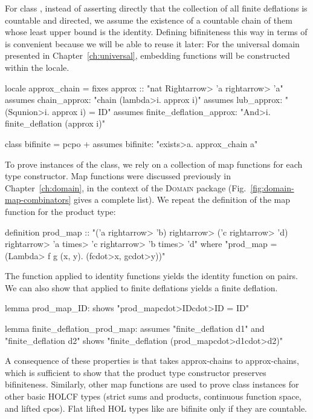 For class , instead of asserting directly that the collection of all finite deflations is countable and directed, we assume the existence of a countable chain of them whose least upper bound is the identity. Defining bifiniteness this way in terms of  is convenient because we will be able to reuse it later: For the universal domain presented in Chapter~\ref{ch:universal}, embedding functions will be constructed within the  locale.
%
\begin{isacode}
locale approx_chain =
  fixes approx :: "nat \<Rightarrow> 'a \<rightarrow> 'a"
  assumes chain_approx: "chain (\<lambda>i. approx i)"
  assumes lub_approx: "(\<Squnion>i. approx i) = ID"
  assumes finite_deflation_approx: "\<And>i. finite_deflation (approx i)"
\end{isacode}
\unmedskip
{}
\begin{isacode}
class bifinite = pcpo +
  assumes bifinite: "\<exists>a. approx_chain a"
\end{isacode}
%
To prove instances of the  class, we rely on a collection of map functions for each type constructor. Map functions were discussed previously in Chapter~\ref{ch:domain}, in the context of the \textsc{Domain} package (Fig.~\ref{fig:domain-map-combinators} gives a complete list). We repeat the definition of the map function for the product type:
%
\begin{isacode}
definition prod_map :: "('a \<rightarrow> 'b) \<rightarrow> ('c \<rightarrow> 'd) \<rightarrow> 'a \<times> 'c \<rightarrow> 'b \<times> 'd"
  where "prod_map = (\<Lambda> f g (x, y). (f\<cdot>x, g\<cdot>y))"
\end{isacode}
%
The  function applied to identity functions yields the identity function on pairs. We can also show that  applied to finite deflations yields a finite deflation.
%
\begin{isacode}
lemma prod_map_ID:
  shows "prod_map\<cdot>ID\<cdot>ID = ID"
\end{isacode}
\unmedskip
{}
\begin{isacode}
lemma finite_deflation_prod_map:
  assumes "finite_deflation d1" and "finite_deflation d2"
  shows "finite_deflation (prod_map\<cdot>d1\<cdot>d2)"
\end{isacode}
%
A consequence of these properties is that  takes approx-chains to approx-chains, which is sufficient to show that the product type constructor preserves bifiniteness. Similarly, other map functions are used to prove  class instances for other basic HOLCF types (strict sums and products, continuous function space, and lifted cpos). Flat lifted HOL types like  are bifinite only if they are countable.

